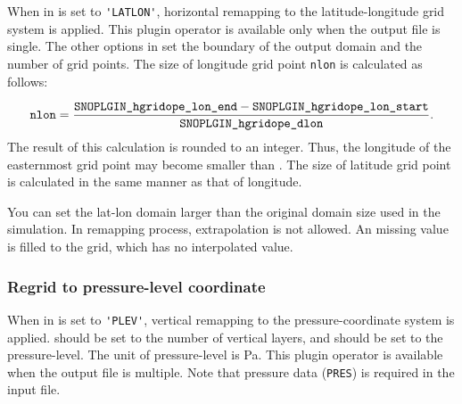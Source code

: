 When  in  is set to \verb|'LATLON'|, horizontal remapping to the latitude-longitude grid system is applied.
This plugin operator is available only when the output file is single.
The other options in  set the boundary of the output domain and the number of grid points. The size of longitude grid point \verb|nlon| is calculated as follows:

\begin{eqnarray}
  \nmitemeq{nlon} = \frac{\nmitemeq{SNOPLGIN_hgridope_lon_end} - \nmitemeq{SNOPLGIN_hgridope_lon_start} }{\nmitemeq{SNOPLGIN_hgridope_dlon}} \nonumber.
\end{eqnarray}
\noindent
The result of this calculation is rounded to an integer. Thus, the longitude of the easternmost grid point may become smaller than .
The size of latitude grid point is calculated in the same manner as that of longitude.

You can set the lat-lon domain larger than the original domain size used in the simulation. In remapping process, extrapolation is not allowed. An missing value is filled to the grid, which has no interpolated value.

\subsubsection{Regrid to pressure-level coordinate}


When  in  is set to \verb|'PLEV'|, vertical remapping to the pressure-coordinate system is applied.
 should be set to the number of vertical layers, and  should be set to the pressure-level.
The unit of pressure-level is Pa.
This plugin operator is available when the output file is multiple.
Note that pressure data (\verb|PRES|) is required in the input file.
